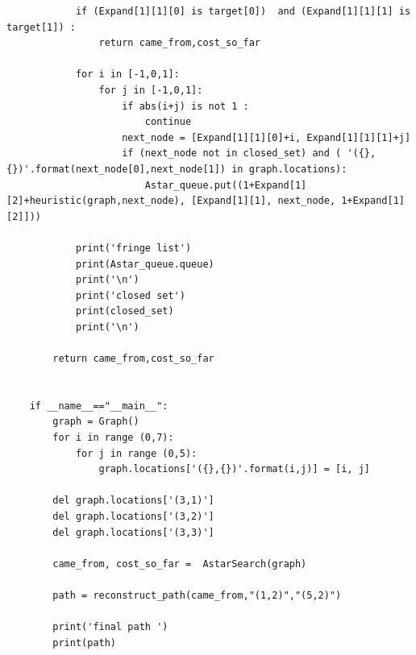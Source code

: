 \documentclass[aps,letterpaper,10pt]{revtex4}
\begin{document}
\begin{lstlisting}
			if (Expand[1][1][0] is target[0])  and (Expand[1][1][1] is target[1]) :
				return came_from,cost_so_far
			
			for i in [-1,0,1]:
				for j in [-1,0,1]:
					if abs(i+j) is not 1 :
						continue
					next_node = [Expand[1][1][0]+i, Expand[1][1][1]+j]
					if (next_node not in closed_set) and ( '({},{})'.format(next_node[0],next_node[1]) in graph.locations):
						Astar_queue.put((1+Expand[1][2]+heuristic(graph,next_node), [Expand[1][1], next_node, 1+Expand[1][2]]))
						
			print('fringe list')
			print(Astar_queue.queue)
			print('\n')
			print('closed set')
			print(closed_set)
			print('\n')

		return came_from,cost_so_far
		

	if __name__=="__main__":
		graph = Graph()
		for i in range (0,7):
			for j in range (0,5):
				graph.locations['({},{})'.format(i,j)] = [i, j]
		
		del graph.locations['(3,1)']
		del graph.locations['(3,2)']
		del graph.locations['(3,3)']

		came_from, cost_so_far =  AstarSearch(graph)

		path = reconstruct_path(came_from,"(1,2)","(5,2)")

		print('final path ')
		print(path)


\end{lstlisting}
\end{document}
